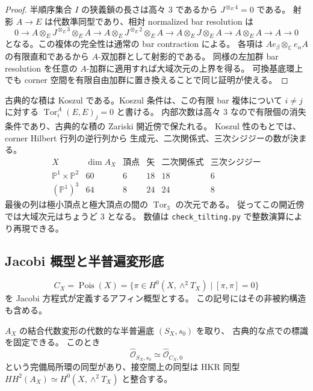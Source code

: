 \begin{proof}
半順序集合 $I$ の狭義鎖の長さは高々 $3$ であるから
$J^{\otimes_E4}=0$ である。
射影 $A\to E$ は代数準同型であり、相対 normalized bar resolution は
\[
 0\longrightarrow A\otimes_EJ^{\otimes_E3}\otimes_EA
 \longrightarrow A\otimes_EJ^{\otimes_E2}\otimes_EA
 \longrightarrow A\otimes_EJ\otimes_EA
 \longrightarrow A\otimes_EA
 \longrightarrow A\longrightarrow0
\]
となる。この複体の完全性は通常の bar contraction による。
各項は $Ae_\beta\otimes_{\mathbb C}e_\alpha A$ の有限直和であるから
$A$-双加群として射影的である。
同様の左加群 bar resolution を任意の $A$-加群に適用すれば大域次元の上界を得る。
可換基底環上でも corner 空間を有限自由加群に置き換えることで同じ証明が使える。
\end{proof}

古典的な積は Koszul である。Koszul 条件は、この有限 bar 複体について
$i\ne j$ に対する $\operatorname{Tor}^{A}_i(E,E)_j=0$ と書ける。
内部次数は高々 $3$ なので有限個の消失条件であり、古典的な積の Zariski 開近傍で保たれる。
Koszul 性のもとでは、corner Hilbert 行列の逆行列から
生成元、二次関係式、三次シジジーの数が決まる。
\[
\begin{array}{c|r|r|r|r|r}
 X&\dim A_X&\text{頂点}&\text{矢}&\text{二次関係式}
      &\text{三次シジジー}\\ \hline
 \mathbb P^1\times\mathbb P^2&60&6&18&18&6\\
 (\mathbb P^1)^3&64&8&24&24&8
\end{array}
\]
最後の列は極小頂点と極大頂点の間の $\operatorname{Tor}_3$ の次元である。
従ってこの開近傍では大域次元はちょうど $3$ となる。
数値は \texttt{check\_tilting.py} で整数演算により再現できる。

\subsection{Jacobi 概型と半普遍変形底}

\[
 C_X=\operatorname{Pois}(X)
 =\{\pi\in H^0(X,\wedge^2T_X)\mid[\pi,\pi]=0\}
\]
を Jacobi 方程式が定義するアフィン概型とする。
この記号にはその非被約構造も含める。

\begin{proposition}\label{prop:poisson-hull}
$A_X$ の結合代数変形の代数的な半普遍底 $(S_X,s_0)$ を取り、
古典的な点での標識を固定できる。
このとき
\[
 \widehat{\mathcal O}_{S_X,s_0}
 \simeq
 \widehat{\mathcal O}_{C_X,0}
\]
という完備局所環の同型があり、接空間上の同型は HKR 同型
$HH^2(A_X)\simeq H^0(X,\wedge^2T_X)$ と整合する。
\end{proposition}

